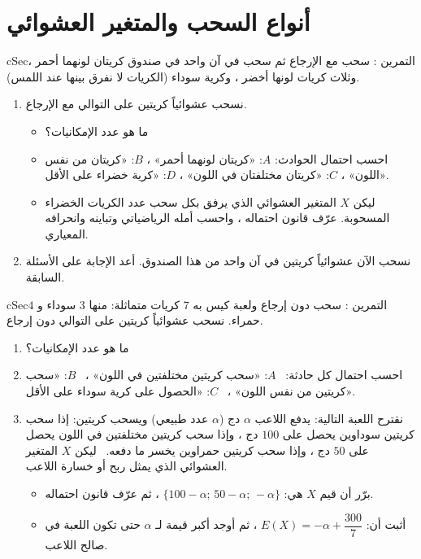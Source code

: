 \documentclass[12pt,a4paper]{article}
\newenvironment{BOX}[2]{\begin{otherlanguage}{english}\begin{arbox}{#1}{#2}}{\end{arbox}\end{otherlanguage}}
\newcounter{exo}
\newenvironment{tamrin}[1]{\stepcounter{exo}\begin{BOX}{cSec}{التمرين \theexo: #1}}{\end{BOX}}
\newenvironment{sq}{\begin{itemize}[leftmargin=2.4em,itemsep=3pt]}{\end{itemize}}
\newcommand{\qa}{\item[(أ)]}\newcommand{\qb}{\item[(ب)]}\newcommand{\qc}{\item[(جـ)]}\newcommand{\qd}{\item[(د)]}\newcommand{\qe}{\item[(هـ)]}
\begin{document}
\section{أنواع السحب والمتغير العشوائي}
\begin{tamrin}{سحب مع الإرجاع ثم سحب في آن واحد}
في صندوق كريتان لونهما أحمر ، وثلاث كريات لونها أخضر ، وكرية سوداء (الكريات لا نفرق بينها عند اللمس).
\begin{enumerate}
\item نسحب عشوائياً كريتين على التوالي مع الإرجاع.
\begin{sq}
\qa ما هو عدد الإمكانيات؟
\qb احسب احتمال الحوادث: $A$: «كريتان لونهما أحمر» ، $B$: «كريتان من نفس اللون» ، $C$: «كريتان مختلفتان في اللون» ، $D$: «كرية خضراء على الأقل».
\qc ليكن $X$ المتغير العشوائي الذي يرفق بكل سحب عدد الكريات الخضراء المسحوبة. عرّف قانون احتماله ، واحسب أمله الرياضياتي وتباينه وانحرافه المعياري.
\end{sq}
\item نسحب الآن عشوائياً كريتين في آن واحد من هذا الصندوق. أعد الإجابة على الأسئلة السابقة.
\end{enumerate}
\end{tamrin}

\begin{tamrin}{سحب دون إرجاع ولعبة}
كيس به $7$ كريات متماثلة: منها $3$ سوداء و $4$ حمراء. نسحب عشوائياً كريتين على التوالي دون إرجاع.
\begin{enumerate}
\item ما هو عدد الإمكانيات؟
\item احسب احتمال كل حادثة: \ $A$: «سحب كريتين مختلفتين في اللون» ، \ $B$: «سحب كريتين من نفس اللون» ، \ $C$: «الحصول على كرية سوداء على الأقل».
\item نقترح اللعبة التالية: يدفع اللاعب $\alpha$ دج ($\alpha$ عدد طبيعي) ويسحب كريتين: إذا سحب كريتين سوداوين يحصل على $100$ دج ، وإذا سحب كريتين مختلفتين في اللون يحصل على $50$ دج ، وإذا سحب كريتين حمراوين يخسر ما دفعه. \ ليكن $X$ المتغير العشوائي الذي يمثل ربح أو خسارة اللاعب.
\begin{sq}
\qa برّر أن قيم $X$ هي: $\{100-\alpha;\,50-\alpha;\,-\alpha\}$ ، ثم عرّف قانون احتماله.
\qb أثبت أن: $E(X)=-\alpha+\dfrac{300}{7}$ ، ثم أوجد أكبر قيمة لـ $\alpha$ حتى تكون اللعبة في صالح اللاعب.
\end{sq}
\end{enumerate}
\end{tamrin}
\end{document}
